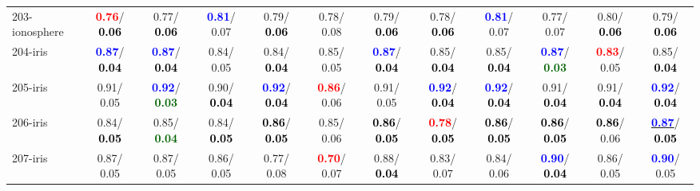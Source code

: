 \begin{table}[h]
\begin{center}
{\begin{tabular}{lc|c|c|c|c|c|c|c|c|c|c}
203-ionosphere & \textcolor{red}{\textbf{  0.76}}/\textcolor{black}{\textbf{  0.06}} &   0.77/\textcolor{black}{\textbf{  0.06}} & \textcolor{blue}{\textbf{  0.81}}/  0.07 &   0.79/\textcolor{black}{\textbf{  0.06}} &   0.78/  0.08 &   0.79/\textcolor{black}{\textbf{  0.06}} &   0.78/\textcolor{black}{\textbf{  0.06}} & \textcolor{blue}{\textbf{  0.81}}/  0.07 &   0.77/  0.07 &   0.80/\textcolor{black}{\textbf{  0.06}} &   0.79/\textcolor{black}{\textbf{  0.06}} \\
204-iris & \textcolor{blue}{\textbf{  0.87}}/\textcolor{black}{\textbf{  0.04}} & \textcolor{blue}{\textbf{  0.87}}/\textcolor{black}{\textbf{  0.04}} &   0.84/  0.05 &   0.84/\textcolor{black}{\textbf{  0.04}} &   0.85/  0.05 & \textcolor{blue}{\textbf{  0.87}}/\textcolor{black}{\textbf{  0.04}} &   0.85/\textcolor{black}{\textbf{  0.04}} &   0.85/\textcolor{black}{\textbf{  0.04}} & \textcolor{blue}{\textbf{  0.87}}/\textcolor{darkgreen}{\textbf{  0.03}} & \textcolor{red}{\textbf{  0.83}}/  0.05 &   0.85/\textcolor{black}{\textbf{  0.04}} \\
205-iris &   0.91/  0.05 & \textcolor{blue}{\textbf{  0.92}}/\textcolor{darkgreen}{\textbf{  0.03}} &   0.90/\textcolor{black}{\textbf{  0.04}} & \textcolor{blue}{\textbf{  0.92}}/\textcolor{black}{\textbf{  0.04}} & \textcolor{red}{\textbf{  0.86}}/  0.06 &   0.91/  0.05 & \textcolor{blue}{\textbf{  0.92}}/\textcolor{black}{\textbf{  0.04}} & \textcolor{blue}{\textbf{  0.92}}/\textcolor{black}{\textbf{  0.04}} &   0.91/\textcolor{black}{\textbf{  0.04}} &   0.91/\textcolor{black}{\textbf{  0.04}} & \textcolor{blue}{\textbf{  0.92}}/\textcolor{black}{\textbf{  0.04}} \\
206-iris &   0.84/\textcolor{black}{\textbf{  0.05}} &   0.85/\textcolor{darkgreen}{\textbf{  0.04}} &   0.84/\textcolor{black}{\textbf{  0.05}} & \textcolor{black}{\textbf{  0.86}}/\textcolor{black}{\textbf{  0.05}} &   0.85/  0.06 & \textcolor{black}{\textbf{  0.86}}/\textcolor{black}{\textbf{  0.05}} & \textcolor{red}{\textbf{  0.78}}/\textcolor{black}{\textbf{  0.05}} & \textcolor{black}{\textbf{  0.86}}/\textcolor{black}{\textbf{  0.05}} & \textcolor{black}{\textbf{  0.86}}/\textcolor{black}{\textbf{  0.05}} & \textcolor{black}{\textbf{  0.86}}/  0.06 & \underline{\textcolor{blue}{\textbf{  0.87}}}/\textcolor{black}{\textbf{  0.05}} \\ \hline
207-iris &   0.87/  0.05 &   0.87/  0.05 &   0.86/  0.05 &   0.77/  0.08 & \textcolor{red}{\textbf{  0.70}}/  0.07 &   0.88/\textcolor{black}{\textbf{  0.04}} &   0.83/  0.07 &   0.84/  0.06 & \textcolor{blue}{\textbf{  0.90}}/\textcolor{black}{\textbf{  0.04}} &   0.86/  0.05 & \textcolor{blue}{\textbf{  0.90}}/  0.05 \\

\end{tabular}}
\end{center}
\end{table}
